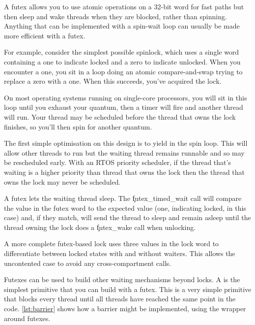 A futex allows you to use atomic operations on a 32-bit word for fast paths but then sleep and wake threads when they are blocked, rather than spinning.
Anything that can be implemented with a spin-wait loop can usually be made more efficient with a futex.

For example, consider the simplest possible spinlock, which uses a single word containing a one to indicate locked and a zero to indicate unlocked.
When you encounter a one, you sit in a loop doing an atomic compare-and-swap trying to replace a zero with a one.
When this succeeds, you've acquired the lock.

On most operating systems running on single-core processors, you will sit in this loop until you exhaust your quantum, then a timer will fire and another thread will run.
Your thread may be scheduled before the thread that owns the lock finishes, so you'll then spin for another quantum.

The first simple optimisation on this design is to yield in the spin loop.
This will allow other threads to run but the waiting thread remains runnable and so may be rescheduled early.
With an RTOS priority scheduler, if the thread that's waiting is a higher priority than thread that owns the lock then the thread that owns the lock may never be scheduled.

A futex lets the waiting thread sleep.
The \c{futex_timed_wait} call will compare the value in the futex word to the expected value (one, indicating locked, in this case) and, if they match, will send the thread to sleep and remain asleep until the thread owning the lock does a \c{futex_wake} call when unlocking.

A more complete futex-based lock uses three values in the lock word to differentiate between locked states with and without waiters.
This allows the uncontented case to avoid any cross-compartment calls.

Futexes can be used to build other waiting mechanisms beyond locks.
A  is the simplest primitive that you can build with a futex.
This is a very simple primitive that blocks every thread until all threads have reached the same point in the code.
\ref{lst:barrier} shows how a barrier might be implemented, using the  wrapper around futexes.

\codelisting[filename=examples/barrier/barrier.cc,marker=entry,label=lst:barrier,caption="Implementing a barrier with a futex"]{}

